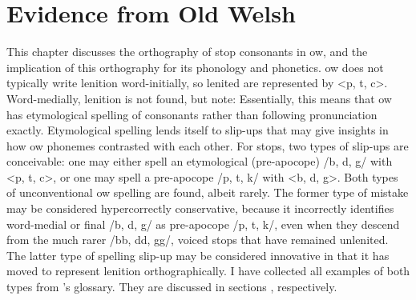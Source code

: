 \chapter{Evidence from Old Welsh}
\label{oldwelsh}
This chapter discusses the orthography of stop consonants in \gls{ow}, and the implication of this orthography for its phonology and phonetics. \Gls{ow} does not typically write lenition word-initially, so lenited  are represented by <p, t, c>. Word-medially, lenition is not found, but note: 
Essentially, this means that \gls{ow} has etymological spelling of consonants rather than following pronunciation exactly. Etymological spelling lends itself to slip-ups that may give insights in how \gls{ow} phonemes contrasted with each other. For stops, two types of slip-ups are conceivable: one may either spell an etymological (pre-apocope) /b, d, g/ with <p, t, c>, or one may spell a pre-apocope /p, t, k/ with <b, d, g>. Both types of unconventional \gls{ow} spelling are found, albeit rarely. The former type of mistake may be considered hypercorrectly conservative, because it incorrectly identifies word-medial or final /b, d, g/ as pre-apocope /p, t, k/, even when they descend from the much rarer /bb, dd, gg/, \ie voiced stops that have remained unlenited. The latter type of spelling slip-up may be considered innovative in that it has moved to represent lenition orthographically. I have collected all examples of both types from \textcite{falileyev_etymological_2000}'s glossary. They are discussed in sections , respectively.






